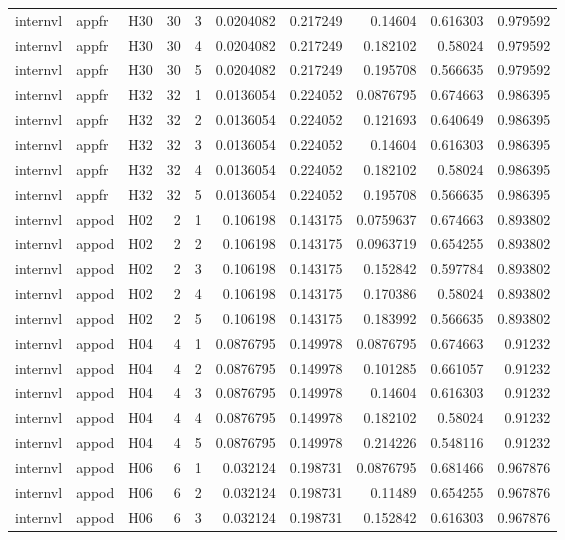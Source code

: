 \begin{longtable}{lllrrrrrrr}
internvl & appfr & H30 & 30 & 3 & 0.0204082 & 0.217249 & 0.14604 & 0.616303 & 0.979592 \\
internvl & appfr & H30 & 30 & 4 & 0.0204082 & 0.217249 & 0.182102 & 0.58024 & 0.979592 \\
internvl & appfr & H30 & 30 & 5 & 0.0204082 & 0.217249 & 0.195708 & 0.566635 & 0.979592 \\
internvl & appfr & H32 & 32 & 1 & 0.0136054 & 0.224052 & 0.0876795 & 0.674663 & 0.986395 \\
internvl & appfr & H32 & 32 & 2 & 0.0136054 & 0.224052 & 0.121693 & 0.640649 & 0.986395 \\
internvl & appfr & H32 & 32 & 3 & 0.0136054 & 0.224052 & 0.14604 & 0.616303 & 0.986395 \\
internvl & appfr & H32 & 32 & 4 & 0.0136054 & 0.224052 & 0.182102 & 0.58024 & 0.986395 \\
internvl & appfr & H32 & 32 & 5 & 0.0136054 & 0.224052 & 0.195708 & 0.566635 & 0.986395 \\
internvl & appod & H02 & 2 & 1 & 0.106198 & 0.143175 & 0.0759637 & 0.674663 & 0.893802 \\
internvl & appod & H02 & 2 & 2 & 0.106198 & 0.143175 & 0.0963719 & 0.654255 & 0.893802 \\
internvl & appod & H02 & 2 & 3 & 0.106198 & 0.143175 & 0.152842 & 0.597784 & 0.893802 \\
internvl & appod & H02 & 2 & 4 & 0.106198 & 0.143175 & 0.170386 & 0.58024 & 0.893802 \\
internvl & appod & H02 & 2 & 5 & 0.106198 & 0.143175 & 0.183992 & 0.566635 & 0.893802 \\
internvl & appod & H04 & 4 & 1 & 0.0876795 & 0.149978 & 0.0876795 & 0.674663 & 0.91232 \\
internvl & appod & H04 & 4 & 2 & 0.0876795 & 0.149978 & 0.101285 & 0.661057 & 0.91232 \\
internvl & appod & H04 & 4 & 3 & 0.0876795 & 0.149978 & 0.14604 & 0.616303 & 0.91232 \\
internvl & appod & H04 & 4 & 4 & 0.0876795 & 0.149978 & 0.182102 & 0.58024 & 0.91232 \\
internvl & appod & H04 & 4 & 5 & 0.0876795 & 0.149978 & 0.214226 & 0.548116 & 0.91232 \\
internvl & appod & H06 & 6 & 1 & 0.032124 & 0.198731 & 0.0876795 & 0.681466 & 0.967876 \\
internvl & appod & H06 & 6 & 2 & 0.032124 & 0.198731 & 0.11489 & 0.654255 & 0.967876 \\
internvl & appod & H06 & 6 & 3 & 0.032124 & 0.198731 & 0.152842 & 0.616303 & 0.967876 \\

\end{longtable}
